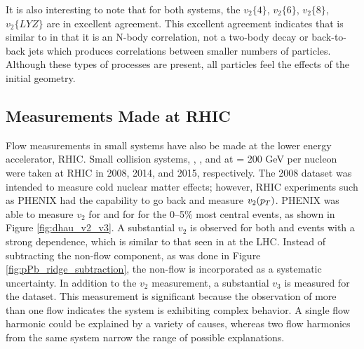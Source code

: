 It is also interesting to note that for both systems, the $v_2\{4\}$, $v_2\{6\}$, $v_2\{8\}$, $v_2\{LYZ\}$ are in excellent agreement. This excellent agreement indicates that \ppb is similar to \pbpb in that it is an N-body correlation, not a two-body decay or back-to-back jets which produces correlations between smaller numbers of particles. Although these types of processes are present, all particles feel the effects of the initial geometry.

\subsection{Measurements Made at RHIC}
Flow measurements in small systems have also be made at the lower energy accelerator, RHIC. Small collision systems, \dau, \hau, and \pau at \sqsn = 200 GeV per nucleon were taken at RHIC in 2008, 2014, and 2015, respectively. The 2008 \dau dataset was intended to measure cold nuclear matter effects; however, RHIC experiments such as PHENIX had the capability to go back and measure $v_2(\mbox{$p_T$})$. PHENIX was able to measure $v_2$ for \dau and for \hau for the 0--5\% most central events, as shown in Figure \ref{fig:dhau_v2_v3}. A substantial $v_2$ is observed for both \dau and \hau events with a strong \pt dependence, which is similar to that seen in \ppb at the LHC. Instead of subtracting the non-flow component, as was done in Figure \ref{fig:pPb_ridge_subtraction}, the non-flow is incorporated as a systematic uncertainty. In addition to the $v_2$ measurement, a substantial $v_3$ is measured for the \hau dataset. This measurement is significant because the observation of more than one flow indicates the system is exhibiting complex behavior. A single flow harmonic could be explained by a variety of causes, whereas two flow harmonics from the same system narrow the range of possible explanations.


